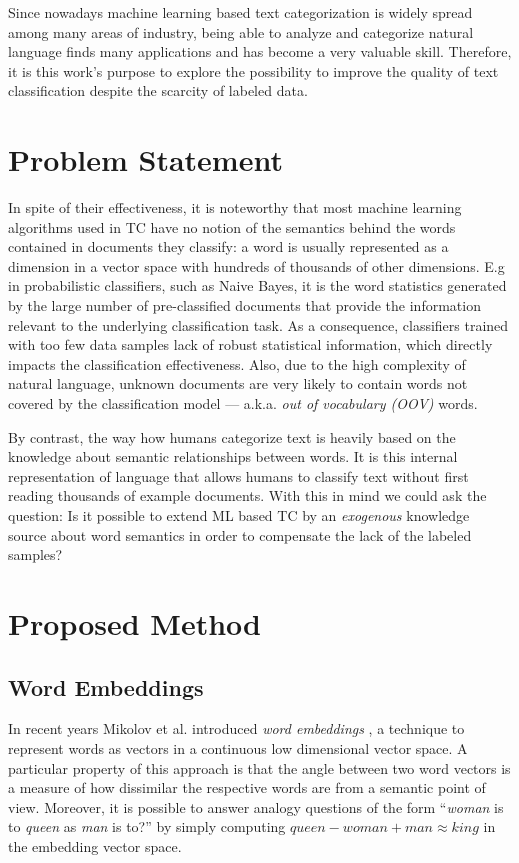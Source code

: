 Since nowadays machine learning based text categorization is widely spread
among many areas of industry, being able to analyze and categorize natural
language finds many applications and has become a very valuable skill. 
Therefore, it is this work's purpose to explore the possibility to improve 
the quality of text classification despite the scarcity of labeled data.

\section{Problem Statement}

In spite of their effectiveness, it is noteworthy that most machine learning
algorithms used in TC have no notion of the semantics behind the words
contained in documents they classify: a word is usually represented as a dimension
in a vector space with hundreds of thousands of other dimensions. E.g in
probabilistic classifiers, such as Naive Bayes, it is the word statistics
generated by the large number of pre-classified documents that provide the information relevant to the
underlying classification task.
As a consequence, classifiers trained with too few data samples lack of
robust statistical information, which directly impacts the classification
effectiveness. Also, due to the high complexity of natural language,
unknown documents are very likely to contain words not covered by the
classification model --- a.k.a. \emph{out of vocabulary (OOV)} words.

By contrast, the way how humans categorize text is heavily based on the
knowledge about semantic relationships between words. It is this internal representation
of language that allows humans to classify text without first reading thousands of example documents. 
With this in mind we could ask the question: Is it possible to extend ML
based TC by an \emph{exogenous} knowledge source about word semantics in order
to compensate the lack of the labeled samples?

\section{Proposed Method}
\label{sec:introduction:proposed-method}
\subsection{Word Embeddings}
In recent years Mikolov et al. introduced \emph{word embeddings}
\cite{mikolov2013distributed}, a technique to represent words as vectors in a continuous low dimensional vector space. 
A particular property of this approach is that the angle
between two word vectors is a measure of how dissimilar the respective words are from a
semantic point of view.
Moreover, it is possible to answer analogy questions of the form ``\emph{woman} is to
 \emph{queen} as \emph{man} is to?'' by simply computing $\mathit{queen} - \mathit{woman} +
\mathit{man} \approx \mathit{king}$ in the embedding vector space. 

